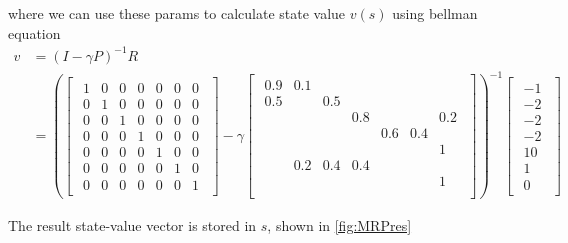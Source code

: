 \documentclass[10pt, a4paper, twocolumn]{article} %
\begin{document}
where we can use these params to calculate state value $v(s)$ using bellman equation
\begin{align*}
	v &= (I - \gamma P)^{-1}R \\
		&= \left( 
		\begin{bmatrix}
			\begin{smallmatrix}
			1&0&0&0&0&0&0\\
			0&1&0&0&0&0&0\\
			0&0&1&0&0&0&0\\
			0&0&0&1&0&0&0\\
			0&0&0&0&1&0&0\\
			0&0&0&0&0&1&0\\
			0&0&0&0&0&0&1
			\end{smallmatrix}
		\end{bmatrix}
		- \gamma
		\begin{bmatrix}
			\begin{smallmatrix}
				0.9			& 0.1		 & 				&				 &			&			& \\
				0.5			&  			 & 0.5		&				 &			&			& \\
		 		& 			 & 				&	0.8		 &			&			& 0.2\\
				& 		 	 & 				&				 & 0.6	&	0.4	& \\
		 		& 		 	 & 				&				 &			&			& 1\\
				& 0.2	 	 & 0.4		&	0.4		 & 			&			& \\
		 		& 		 	 & 				&				 &			&			& 1\\
			\end{smallmatrix}
		\end{bmatrix}
		\right)^{-1}
		\begin{bmatrix}
			\begin{smallmatrix}
			-1 \\
			-2 \\
			-2 \\
			-2 \\
			10 \\
			1\\
			0
			\end{smallmatrix}
		\end{bmatrix}
\end{align*}

The result state-value vector is stored in $s$, shown in \ref{fig:MRPres}
\end{document}
